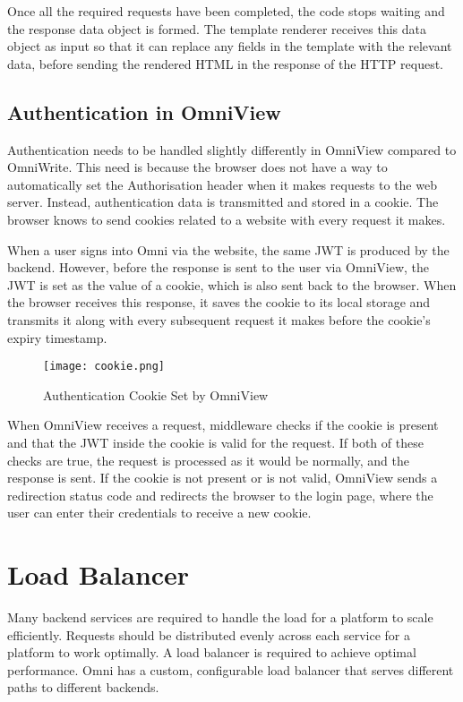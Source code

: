 Once all the required requests have been completed, the code stops waiting and the response data object is formed.
The template renderer receives this data object as input so that it can replace any fields in the template with the relevant data, before sending the rendered HTML in the response of the HTTP request.

\subsection{Authentication in OmniView}
Authentication needs to be handled slightly differently in OmniView compared to OmniWrite.
This need is because the browser does not have a way to automatically set the Authorisation header when it makes requests to the web server.
Instead, authentication data is transmitted and stored in a cookie. The browser knows to send cookies related to a website with every request it makes. 

When a user signs into Omni via the website, the same JWT is produced by the backend.
However, before the response is sent to the user via OmniView, the JWT is set as the value of a cookie, which is also sent back to the browser.
When the browser receives this response, it saves the cookie to its local storage and transmits it along with every subsequent request it makes before the cookie's expiry timestamp. 

\begin{figure}[htbp]
\texttt{[image: cookie.png]}
\centering
\caption{Authentication Cookie Set by OmniView}
\label{fig:auth-cookie}
\end{figure}

When OmniView receives a request, middleware checks if the cookie is present and that the JWT inside the cookie is valid for the request.
If both of these checks are true, the request is processed as it would be normally, and the response is sent.
If the cookie is not present or is not valid, OmniView sends a redirection status code and redirects the browser to the login page, where the user can enter their credentials to receive a new cookie.

\section{Load Balancer}
Many backend services are required to handle the load for a platform to scale efficiently.
Requests should be distributed evenly across each service for a platform to work optimally. A load balancer is required to achieve optimal performance.
Omni has a custom, configurable load balancer that serves different paths to different backends.

